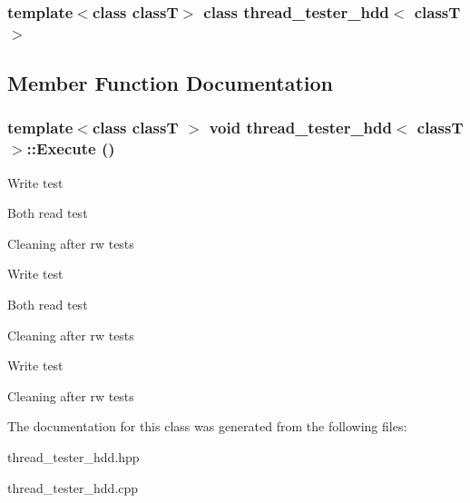 \subsubsection*{template$<$class classT$>$ class thread\_\-tester\_\-hdd$<$ classT $>$}



\subsection{Member Function Documentation}
\hypertarget{classthread__tester__hdd_aad16d6b6f1be66d5e851fa2b0408cf06}{
\subsubsection[{Execute}]{\setlength{\rightskip}{0pt plus 5cm}template$<$class classT $>$ void {\bf thread\_\-tester\_\-hdd}$<$ classT $>$::Execute ()}}
\label{classthread__tester__hdd_aad16d6b6f1be66d5e851fa2b0408cf06}


Write test

Both read test

Cleaning after rw tests

Write test

Both read test

Cleaning after rw tests

Write test

Cleaning after rw tests 



The documentation for this class was generated from the following files:\begin{DoxyCompactItemize}
\item 
thread\_\-tester\_\-hdd.hpp\item 
thread\_\-tester\_\-hdd.cpp\end{DoxyCompactItemize}
